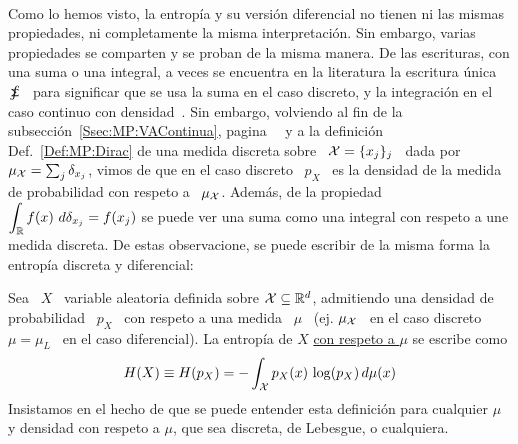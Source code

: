 \

Como lo hemos  visto, la entrop\'ia y su versi\'on diferencial  no tienen ni las
mismas  propiedades, ni  completamente la  misma interpretaci\'on.  Sin embargo,
varias  propiedades  se  comparten y  se  proban  de  la  misma manera.  De  las
escrituras, con una  suma o una integral, a veces se  encuentra en la literatura
la escritura \'unica \ $\sumint$ \ para significar que se usa la suma en el caso
discreto, y la integraci\'on en el caso continuo con densidad~\cite{Rio07}.  Sin
embargo,   volviendo  al   fin   de  la   subsecci\'on~\ref{Ssec:MP:VAContinua},
pagina~\pageref{Pagina:MP:DensidadDiscreta}    \    y    a    la    definici\'on
Def.~\ref{Def:MP:Dirac} de una medida discreta sobre \ $\mathcal{X} = \{ x_j \}_j$ \ dada
por \ $\mu_{\mathcal{X}} = \sum_j \delta_{x_j}$, vimos de que en el caso discreto \ $p_X$ \
es la densidad de la medida de probabilidad con respeto a \ $\mu_{\mathcal{X}}$.  Adem\'as,
de  la propiedad  $\displaystyle \int_{\mathbb{R}}  f(x) \  d\delta_{x_j} =  f(x_j)$ se
puede ver  una suma  como una integral  con respeto  a une medida  discreta.  De
estas observacione, se puede escribir de la misma forma la entrop\'ia discreta y
diferencial:
%
\begin{definicion}\label{Def:SZ:ShanonMu}
  Sea  \  $X$  \  variable  aleatoria definida  sobre  $\mathcal{X}  \subseteq  \mathbb{R}^d$,
  admitiendo una densidad  de probabilidad \ $p_X$ \ con respeto  a una medida \
  $\mu$ \  (ej. $\mu_{\mathcal{X}}$  \ en el  caso discreto \  $\mu =  \mu_L$ \ en  el caso
  diferencial). La entrop\'ia de $X$  \underline{con respeto a $\mu$} se escribe
  como
  \[
  H(X) \equiv H(p_X) = - \int_{\mathcal{X}} p_X(x) \, \log(p_X) \, d\mu(x)
  \]
  Insistamos  en  el hecho  de  que se  puede  entender  esta definici\'on  para
  cualquier $\mu$ y densidad con respeto a $\mu$, que sea discreta, de Lebesgue,
  o cualquiera.
\end{definicion}